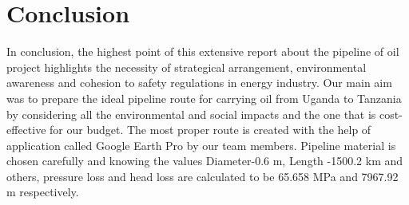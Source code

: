 \documentclass[12pt]{article}
\begin{document}
\section*{Conclusion}
{\fontsize{12pt}{12pt}\selectfont
\hspace*{1em} In conclusion, the highest point of this extensive report about the pipeline of oil project highlights the necessity of strategical arrangement, environmental awareness and cohesion to safety regulations in energy industry. Our main aim was to prepare the ideal pipeline route for carrying oil from Uganda to Tanzania by considering all the environmental and social impacts and the one that is cost-effective for our budget. The most proper route is created with the help of application called Google Earth Pro by our team members. Pipeline material is chosen carefully and knowing the values Diameter-0.6 m, Length -1500.2 km and others, pressure loss and head loss are calculated to be 65.658 MPa and 7967.92 m respectively.

}
\end{document}
